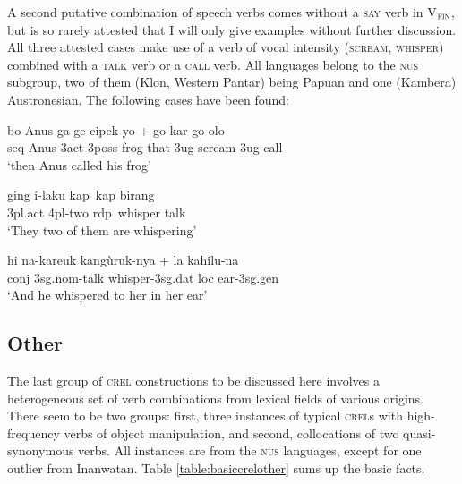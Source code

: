 A second putative combination of speech verbs comes without a \textsc{say} verb in V$_{\textsc{fin}}$, but is so rarely attested that I will only give examples without further discussion. All three attested cases make use of a verb of vocal intensity (\textsc{scream}, \textsc{whisper}) combined with a \textsc{talk} verb or a \textsc{call} verb. All languages belong to the \textsc{nus} subgroup, two of them (Klon, Western Pantar) being Papuan and one (Kambera) Austronesian. The following cases have been found:

\ea \label{Klon077}
\gll bo Anus ga ge eipek yo + go-kar go-olo \\
\acs{seq} Anus \acs{3}\acs{act} \acs{3}\acs{poss} frog that \acs{3}\acs{ug}-scream \acs{3}\acs{ug}-call \\
\glft `then Anus called his frog' \\ 
\z
\xe

\ea \label{WesternPantar030}
\gll ging i-laku kap~kap birang \\
\acs{3}\acs{pl}.\acs{act} \acs{4}\acs{pl}-two \acs{rdp}~whisper talk \\
\glft `They two of them are whispering' \\ 
\z
\xe

\ea \label{Kambera004}
\gll hi na-kareuk kangùruk-nya + la kahilu-na \\
\acs{conj} \acs{3}\acs{sg}.\acs{nom}-talk whisper-\acs{3}\acs{sg}.\acs{dat} \acs{loc} ear-\acs{3}\acs{sg}.\acs{gen} \\
\glft `And he whispered to her in her ear' \\ 
\z
\xe

\subsection{Other} \label{sec:other}
The last group of \textsc{crel} constructions to be discussed here involves a heterogeneous set of verb combinations from lexical fields of various origins. There seem to be two groups: first, three instances of typical \textsc{crel}s with high-frequency verbs of object manipulation, and second, collocations of two quasi-synonymous verbs. All instances are from the \textsc{nus} languages, except for one outlier from Inanwatan. Table \ref{table:basiccrelother} sums up the basic facts.

